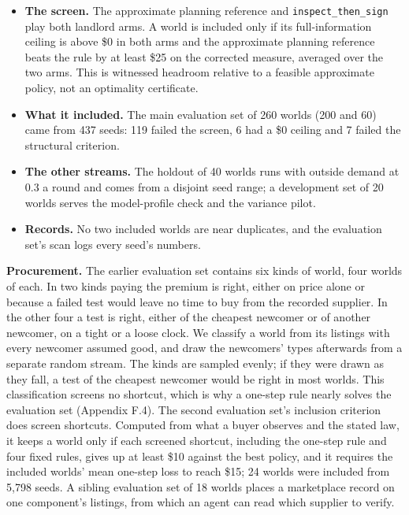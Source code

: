 \begin{itemize}
\tightlist
\item
  \textbf{The screen.} The approximate planning reference and \texttt{inspect\_\allowbreak{}then\_\allowbreak{}sign} play both landlord arms. A world is included only
  if its full-information ceiling is above \$0 in both arms and the approximate planning reference beats the rule by at least
  \$25 on the corrected measure, averaged over the two arms. This is witnessed headroom relative to a feasible approximate policy, not an optimality certificate.
\item
  \textbf{What it included.} The main evaluation set of 260 worlds (200 and 60) came from 437 seeds: 119 failed the
  screen, 6 had a \$0 ceiling and 7 failed the structural criterion.
\item
  \textbf{The other streams.} The holdout of 40 worlds runs with outside demand at 0.3 a round and comes from a disjoint
  seed range; a development set of 20 worlds serves the model-profile check and the variance pilot.
\item
  \textbf{Records.} No two included worlds are near duplicates, and the evaluation set's scan logs every seed's numbers.
\end{itemize}

\textbf{Procurement.} The earlier evaluation set contains six kinds of world, four worlds of each. In two
kinds paying the premium is right, either on price alone or because a failed test would leave no
time to buy from the recorded supplier. In the other four a test is right, either of the cheapest
newcomer or of another newcomer, on a tight or a loose clock. We classify a world from its listings
with every newcomer assumed good, and draw the newcomers' types afterwards from a separate random
stream. The kinds are sampled evenly; if they were drawn as they fall, a test of the cheapest
newcomer would be right in most worlds. This classification screens no shortcut, which is why a
one-step rule nearly solves the evaluation set (Appendix F.4). The second evaluation set's inclusion
criterion does screen shortcuts. Computed from what a buyer observes and the stated law, it keeps a
world only if each screened shortcut, including the one-step rule and four fixed rules, gives up at
least \$10 against the best policy, and it requires the included worlds' mean one-step loss to reach
\$15; 24 worlds were included from 5,798 seeds. A sibling evaluation set of 18 worlds places a
marketplace record on one component's listings, from which an agent can read which supplier to
verify.

